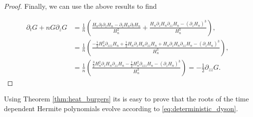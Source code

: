 \begin{proof}
    Finally, we can use the above results to find

    \begin{align*}
        \partial_t G + n G\partial_z G &= \frac1n\left(\frac{ H_n \partial_t \partial_z H_n - \partial_z H_n \partial_t H_n }{H_n^2} + \frac{H_n\partial_z H_n \partial_{zz}H_n - (\partial_z H_n)^3}{H_n^3} \right),\\ 
        &= \frac1n\left( \frac{ -\frac12H_n^2 \partial_{zzz} H_n + \frac12H_n\partial_z H_n \partial_{zz} H_n + H_n\partial_z H_n \partial_{zz}H_n - (\partial_z H_n)^3}{H_n^3} \right), \\ 
        &= \frac1n\left( \frac{\frac32 H_n^2 \partial_{z}H_n\partial_{zz}H_n - \frac12H_n^2\partial_{zzz}H_n - (\partial_z H_n)^3}{H_n^3} \right) = -\frac12 \partial_{zz}G.
    \end{align*}
\end{proof}

Using Theorem \ref{thm:heat_burgers} its is easy to prove that the roots of the time dependent Hermite polynomials evolve according to \eqref{eq:deterministic_dyson}.

